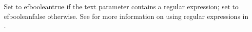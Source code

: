     Set to \jb{}efbooleantrue if the text parameter contains a regular
    expression; set to \jb{}efbooleanfalse otherwise. See 
    for more information on using regular expressions in \jb{}{}.
